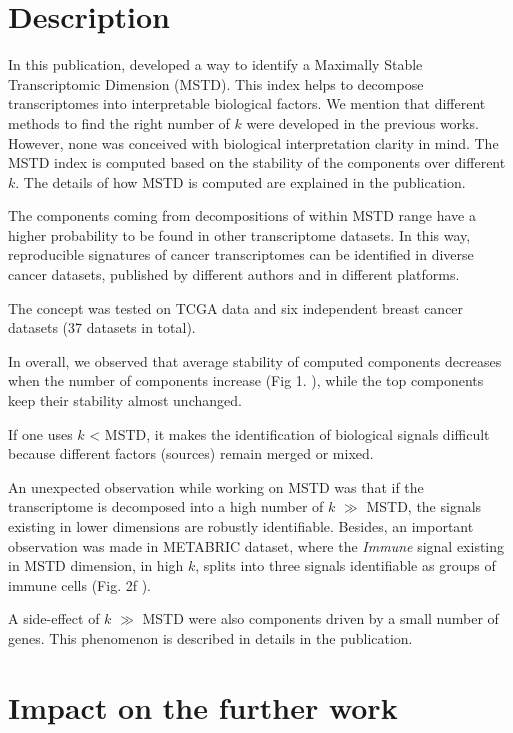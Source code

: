 \documentclass[12pt,]{book}
\theoremstyle{definition}
\theoremstyle{definition}
\theoremstyle{definition}
\theoremstyle{remark}
\begin{document}
\hypertarget{description}{%
\section{Description}\label{description}}

In this publication, \citet{Kairov2017} developed a way to identify a
Maximally Stable Transcriptomic Dimension (MSTD). This index helps to
decompose transcriptomes into interpretable biological factors. We
mention that different methods to find the right number of \(k\) were
developed in the previous works. However, none was conceived with
biological interpretation clarity in mind. The MSTD index is computed
based on the stability of the components over different \(k\). The
details of how MSTD is computed are explained in the publication.

The components coming from decompositions of within MSTD range have a
higher probability to be found in other transcriptome datasets. In this
way, reproducible signatures of cancer transcriptomes can be identified
in diverse cancer datasets, published by different authors and in
different platforms.

The concept was tested on TCGA data and six independent breast cancer
datasets (37 datasets in total).

In overall, we observed that average stability of computed components
decreases when the number of components increase (Fig 1.
\citep{Kairov2017}), while the top components keep their stability
almost unchanged.

If one uses \(k\) \textless{} MSTD, it makes the identification of
biological signals difficult because different factors (sources) remain
merged or mixed.

An unexpected observation while working on MSTD was that if the
transcriptome is decomposed into a high number of \(k\) \(\gg\) MSTD,
the signals existing in lower dimensions are robustly identifiable.
Besides, an important observation was made in METABRIC dataset, where
the \emph{Immune} signal existing in MSTD dimension, in high \(k\),
splits into three signals identifiable as groups of immune cells (Fig.
2f \citep{Kairov2017}).

A side-effect of \(k\) \(\gg\) MSTD were also components driven by a
small number of genes. This phenomenon is described in details in the
publication.

\hypertarget{impact-on-the-further-work}{%
\section{Impact on the further work}\label{impact-on-the-further-work}}
\end{document}
